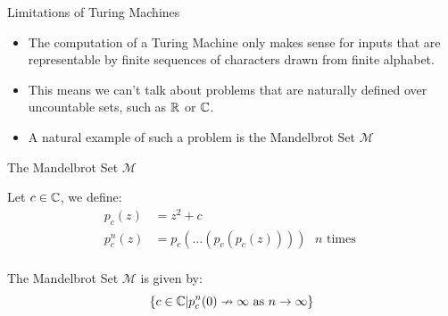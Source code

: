 \documentclass[c]{beamer}
\begin{document}
\begin{frame}{Limitations of Turing Machines}

  \begin{itemize}
  \item The computation of a Turing Machine only makes sense for
    inputs that are representable by finite sequences of characters
    drawn from finite alphabet. \pause
  \item This means we can't talk about problems that are naturally
    defined over uncountable sets, such as $\mathbb{R}$ or $\mathbb{C}$.\pause
  \item A natural example of such a problem is the Mandelbrot Set
    $\mathcal{M}$
  \end{itemize}
  
\end{frame}

\begin{frame}{The Mandelbrot Set $\mathcal{M}$}
  
  Let $c \in \mathbb{C}$, we define:
    \begin{align*}
      p_c(z) &= z^2 + c\\
      p_c^n(z) &= p_c(\ldots(p_c(p_c(z)))) \text{ $n$ times }\\
    \end{align*}
    \vspace{-\baselineskip}
    
    The Mandelbrot Set $\mathcal{M}$ is given by:
    $$\{c \in \mathbb{C} |p_c^n(0) \nrightarrow \infty \text{ as } n \rightarrow \infty\}$$
    
\end{frame}
\end{document}
